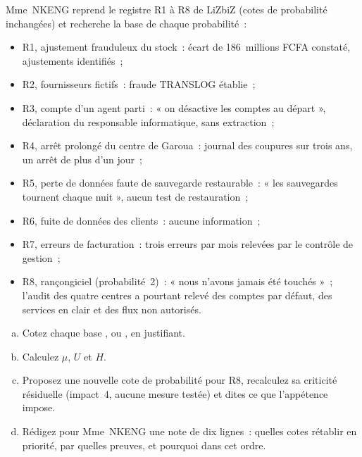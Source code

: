 \begin{boxexo}[title={\ding{45}\quad Exercice~2.4. La base de preuve du registre de LiZbiZ \niveauexpert}]
Mme~NKENG reprend le registre R1 à R8 de LiZbiZ (cotes de probabilité
inchangées) et recherche la base de chaque probabilité~:
\begin{itemize}
    \item R1, ajustement frauduleux du stock~: écart de 186~millions FCFA
          constaté, ajustements identifiés~;
    \item R2, fournisseurs fictifs~: fraude TRANSLOG établie~;
    \item R3, compte d'un agent parti~: « on désactive les comptes au
          départ », déclaration du responsable informatique, sans
          extraction~;
    \item R4, arrêt prolongé du centre de Garoua~: journal des coupures sur
          trois ans, un arrêt de plus d'un jour~;
    \item R5, perte de données faute de sauvegarde restaurable~: « les
          sauvegardes tournent chaque nuit », aucun test de restauration~;
    \item R6, fuite de données des clients~: aucune information~;
    \item R7, erreurs de facturation~: trois erreurs par mois relevées par
          le contrôle de gestion~;
    \item R8, rançongiciel (probabilité~2)~: « nous n'avons jamais été
          touchés »~; l'audit des quatre centres a pourtant relevé des
          comptes par défaut, des services en clair et des flux non
          autorisés.
\end{itemize}
\begin{enumerate}[(a)]
    \item Cotez chaque base \OUI{}, \NON{} ou \NEK{}, en justifiant.
    \item Calculez $\mu$, $U$ et $H$.
    \item Proposez une nouvelle cote de probabilité pour R8, recalculez sa
          criticité résiduelle (impact~4, aucune mesure testée) et dites ce
          que l'appétence impose.
    \item Rédigez pour Mme~NKENG une note de dix lignes~: quelles cotes
          rétablir en priorité, par quelles preuves, et pourquoi dans cet
          ordre.
\end{enumerate}
\end{boxexo}

\bigskip

